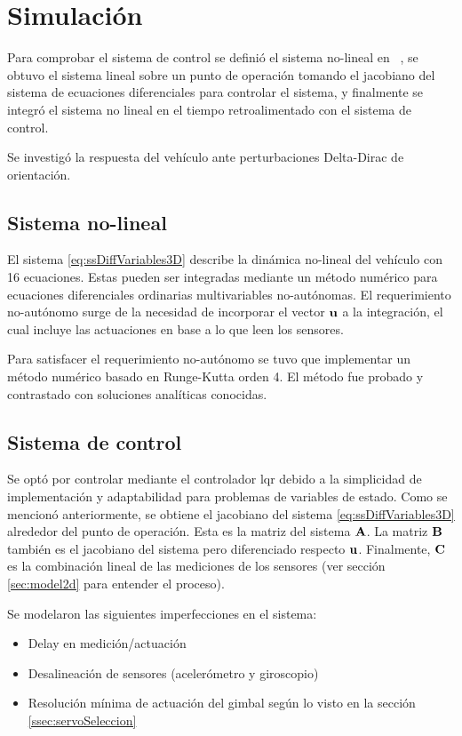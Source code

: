\section{Simulación}

Para comprobar el sistema de control se definió el sistema no-lineal en \Matlab~, se obtuvo el sistema lineal sobre un punto de operación tomando el jacobiano del sistema de ecuaciones diferenciales para controlar el sistema, y finalmente se integró el sistema no lineal en el tiempo retroalimentado con el sistema de control.

Se investigó la respuesta del vehículo ante perturbaciones Delta-Dirac de orientación.

\subsection{Sistema no-lineal}

El sistema \eqref{eq:ssDiffVariables3D} describe la dinámica no-lineal del vehículo con 16 ecuaciones. Estas pueden ser integradas mediante un método numérico para ecuaciones diferenciales ordinarias multivariables no-autónomas. El requerimiento no-autónomo surge de la necesidad de incorporar el vector $\mathbf{u}$ a la integración, el cual incluye las actuaciones en base a lo que leen los sensores. 

\medskip

Para satisfacer el requerimiento no-autónomo se tuvo que implementar un método numérico basado en Runge-Kutta orden 4. El método fue probado y contrastado con soluciones analíticas conocidas.

\subsection{Sistema de control}

Se optó por controlar mediante el controlador \gls{lqr} debido a la simplicidad de implementación y adaptabilidad para problemas de variables de estado. Como se mencionó anteriormente, se obtiene el jacobiano del sistema \eqref{eq:ssDiffVariables3D} alrededor del punto de operación. Esta es la matriz del sistema $\mathbf{A}$. La matriz $\mathbf{B}$ también es el jacobiano del sistema pero diferenciado respecto $\mathbf{u}$. Finalmente, $\mathbf{C}$ es la combinación lineal de las mediciones de los sensores (ver sección \ref{sec:model2d} para entender el proceso). 

Se modelaron las siguientes imperfecciones en el sistema:

\begin{itemize}
    \item Delay en medición/actuación
    \item Desalineación de sensores (acelerómetro y giroscopio)
    \item Resolución mínima de actuación del gimbal según lo visto en la sección \ref{ssec:servoSeleccion}
\end{itemize}

